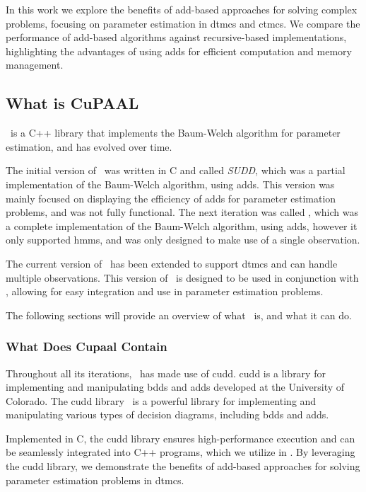 In this work we explore the benefits of \gls{add}-based approaches for solving complex problems, focusing on parameter estimation in \glspl{dtmc} and \glspl{ctmc}.
We compare the performance of \gls{add}-based algorithms against recursive-based implementations, highlighting the advantages of using \glspl{add} for efficient computation and memory management.

\subsection{What is CuPAAL}\label{subsec:what_is_cupaal}
\Cupaal\ is a C++ library that implements the Baum-Welch algorithm for parameter estimation, and has evolved over time.

The initial version of \Cupaal\ was written in C and called \textit{SUDD}, which was a partial implementation of the Baum-Welch algorithm, using \glspl{add}.
This version was mainly focused on displaying the efficiency of \glspl{add} for parameter estimation problems, and was not fully functional.
The next iteration was called \Cupaal, which was a complete implementation of the Baum-Welch algorithm, using \glspl{add}, however it only supported \glspl{hmm}, and was only designed to make use of a single observation.

The current version of \Cupaal\ has been extended to support \glspl{dtmc} and can handle multiple observations.
This version of \Cupaal\ is designed to be used in conjunction with \Jajapy, allowing for easy integration and use in parameter estimation problems.

The following sections will provide an overview of what \Cupaal\ is, and what it can do.

\subsubsection{What Does Cupaal Contain}\label{subsec:what_does_cupaal_contain}
Throughout all its iterations, \Cupaal\ has made use of \gls{cudd}.
\acrfull{cudd} is a library for implementing and manipulating \glspl{bdd} and \glspl{add} developed at the University of Colorado.
The \gls{cudd} library~\cite{somenzi1997cudd} is a powerful library for implementing and manipulating various types of decision diagrams, including \glspl{bdd} and \glspl{add}.

Implemented in C, the \gls{cudd} library ensures high-performance execution and can be seamlessly integrated into C++ programs, which we utilize in \Cupaal.
By leveraging the \gls{cudd} library, we demonstrate the benefits of \gls{add}-based approaches for solving parameter estimation problems in \glspl{dtmc}.

